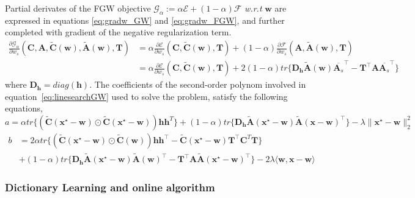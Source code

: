 \documentclass{article}
\newcommand{\scalar}[2]{\langle #1 , #2 \rangle}
\def\eqref#1{equation~\ref{#1}}
\def\vh{{\bm{h}}}
\def\vw{{\bm{w}}}
\def\vx{{\bm{x}}}
\def\mA{{\bm{A}}}
\def\mC{{\bm{C}}}
\def\mD{{\bm{D}}}
\def\mT{{\bm{T}}}
\begin{document}
	Partial derivates of the FGW objective $\mathcal{G}_{\alpha} :=\alpha\mathcal{E} +(1-\alpha)\mathcal{F}$ \emph{w.r.t} $\vw$ are expressed in equations \ref{eq:gradw_GW} and \ref{eq:gradw_FGW}, and further completed with gradient of the negative regularization term.
	\begin{equation} \label{eq:gradw_FGW}
	\begin{split}
	\frac{\partial \mathcal{G}_\alpha }{\partial w_s}(\mC,\mA,\widetilde{\mC}(\vw),\widetilde{\mA}(\vw),\mT) &= \alpha\frac{\partial \mathcal{E} }{\partial w_s}(\mC,\widetilde{\mC}(\vw),\mT) +(1-\alpha)\frac{\partial \mathcal{F} }{\partial w_s}(\mA,\widetilde{\mA}(\vw),\mT) \\
	&= \alpha\frac{\partial \mathcal{E} }{\partial w_s}(\mC,\widetilde{\mC}(\vw),\mT) 
	+2(1-\alpha) tr\{\mD_{\vh} \widetilde{\mA}(\vw) \overline{\mA_s}^\top - \mT^\top \mA \overline{\mA_s}^\top\}
	\end{split} 
	\end{equation}
	where $\mD_{\vh} = diag(\vh)$.
	The coefficients of the second-order polynom involved in \eqref{eq:linesearchGW} used to solve the problem, satisfy the following equations,
	\begin{equation}
	a= \alpha tr\{ \left(\widetilde{\mC}(\vx^\star - \vw) \odot \widetilde{\mC}(\vx^\star - \vw)\right)\vh\vh^T \} +(1-\alpha)tr\{\mD_{\vh}\widetilde{\mA}(\vx^\star - \vw)\widetilde{\mA}(\vx - \vw)^\top\}- \lambda \| \vx^\star- \vw\|_2^2
	\end{equation}
	\begin{equation}
	\begin{split}
	b&= 2\alpha tr\{\left( \widetilde{\mC}(\vx^\star - \vw) \odot \widetilde{\mC}(\vw)\right)\vh\vh^\top - \widetilde{\mC}(\vx^\star - \vw)\mT^{\top}\mC^T \mT\}\\
	&+(1-\alpha) tr\{ \mD_{\vh}\widetilde{\mA}(\vx^\star - \vw)\widetilde{\mA}(\vw)^\top - \mT^\top \mA \widetilde{\mA}(\vx^\star - \vw)^\top\} - 2 \lambda \scalar{\vw}{\vx-\vw}
	\end{split}
	\end{equation}
	\subsubsection{Dictionary Learning and online algorithm}
	
\end{document}

